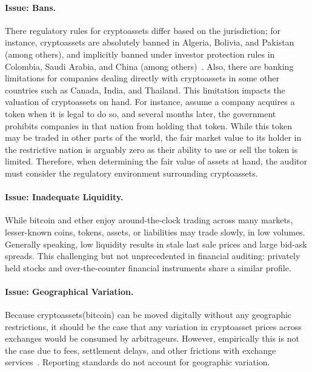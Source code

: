 \paragraph{Issue: Bans.} There regulatory rules for cryptoassets differ based on the jurisdiction; for instance, cryptoassets are absolutely banned in Algeria, Bolivia, and Pakistan (among others), and implicitly banned under investor protection rules in Colombia, Saudi Arabia, and China (among others)~\cite{cryptoLegalityWiki}. Also, there are banking limitations for companies dealing directly with cryptoassets in some other countries such as Canada, India, and Thailand. This limitation impacts the valuation of cryptoassets on hand. For instance, assume a company acquires a token when it is legal to do so, and several months later, the government prohibits companies in that nation from holding that token. While this token may be traded in other parts of the world, the fair market value to its holder in the restrictive nation is arguably zero as their ability to use or sell the token is limited. Therefore, when determining the fair value of assets at hand, the auditor must consider the regulatory environment surrounding cryptoassets. 

\paragraph{Issue: Inadequate Liquidity.} While bitcoin and ether enjoy around-the-clock trading across many markets, lesser-known coins, tokens, assets, or liabilities may trade slowly, in low volumes. Generally speaking, low liquidity results in stale last sale prices and large bid-ask spreads. This challenging but not unprecedented in financial auditing: privately held stocks and over-the-counter financial instruments share a similar profile.

\paragraph{Issue: Geographical Variation.} Because cryptoassets(\eg bitcoin) can be moved digitally without any geographic restrictions, it should be the case that any variation in cryptoasset prices across exchanges would be consumed by arbitrageurs. However, empirically this is not the case due to fees, settlement delays, and other frictions with exchange services~\cite{KS17}. Reporting standards do not account for geographic variation. 

